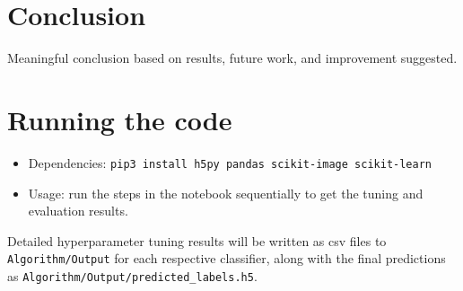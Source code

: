 \documentclass[landscape,twocolumn]{article}
\begin{document}
\section{Conclusion}
Meaningful conclusion based on results, future work, and improvement suggested.

\printbibliography\appendix
\section{Running the code}
\begin{itemize}
\item Dependencies: \texttt{pip3 install h5py pandas scikit-image scikit-learn}
\item Usage: run the steps in the notebook sequentially to get the tuning and evaluation results.
\end{itemize}
Detailed hyperparameter tuning results will be written as csv files to \texttt{Algorithm/Output} for each respective classifier, along with the final predictions as \texttt{Algorithm/Output/predicted\_labels.h5}.
\end{document}
